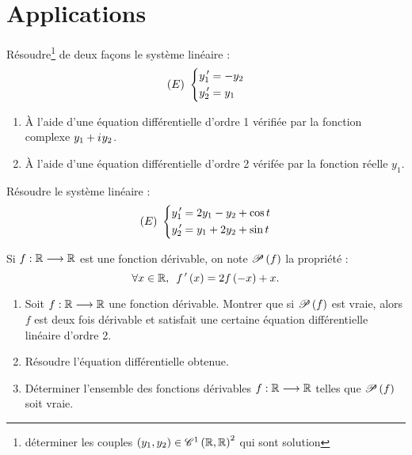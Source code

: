 \section{Applications}

\begin{exo}[Exercice 15]
Résoudre\footnote{\Cad déterminer les couples \(\paren{y_1,y_2}\in\ensclasse{1}{\R}{\R}^2\) qui sont solution} de deux façons le système linéaire : \[\paren{E}~\begin{dcases}
y_1\prim=-y_2 \\
y_2\prim=y_1
\end{dcases}\]

\begin{enumerate}
    \item À l'aide d'une équation différentielle d'ordre 1 vérifiée par la fonction complexe \(y_1+\i y_2\). \\
    \item À l'aide d'une équation différentielle d'ordre 2 vérifée par la fonction réelle \(y_1\).
\end{enumerate}
\end{exo}

\begin{corr}
\end{corr}

\begin{exo}[Exercice 16]
Résoudre le système linéaire : \[\paren{E}~\begin{dcases}
y_1\prim=2y_1-y_2+\cos t \\
y_2\prim=y_1+2y_2+\sin t
\end{dcases}\]
\end{exo}

\begin{corr}
\end{corr}

\begin{exo}[Exercice 17]
Si \(f:\R\to\R\) est une fonction dérivable, on note \(\P{f}\) la propriété : \[\quantifs{\forall x\in\R}f\prim\paren{x}=2f\paren{-x}+x.\]

\begin{enumerate}
    \item Soit \(f:\R\to\R\) une fonction dérivable. Montrer que si \(\P{f}\) est vraie, alors \(f\) est deux fois dérivable et satisfait une certaine équation différentielle linéaire d'ordre 2. \\
    \item Résoudre l'équation différentielle obtenue. \\
    \item Déterminer l'ensemble des fonctions dérivables \(f:\R\to\R\) telles que \(\P{f}\) soit vraie.
\end{enumerate}
\end{exo}

\begin{corr}
\end{corr}